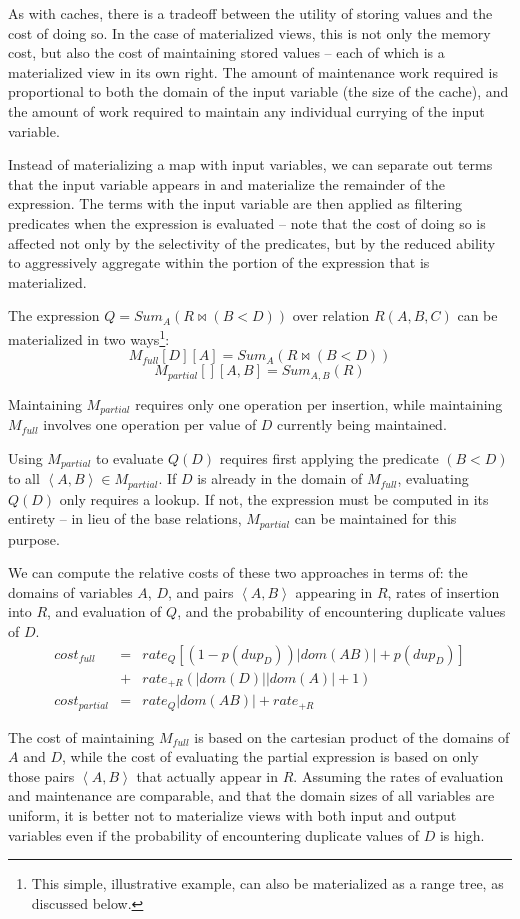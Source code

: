 As with caches, there is a tradeoff between the utility of storing values and the cost of doing so.  In the case of materialized views, this is not only the memory cost, but also the cost of maintaining stored values -- each of which is a materialized view in its own right.  The amount of maintenance work required is proportional to both the domain of the input variable (the size of the cache), and the amount of work required to maintain any individual currying of the input variable.  

Instead of materializing a map with input variables, we can separate out terms that the input variable appears in and materialize the remainder of the expression.  The terms with the input variable are then applied as filtering predicates when the expression is evaluated -- note that the cost of doing so is  affected not only by the selectivity of the predicates, but by the reduced ability to aggressively aggregate within the portion of the expression that is materialized.

\begin{example}
The expression $Q = Sum_A(R \bowtie (B < D))$ over relation $R(A,B,C)$ can be materialized in two ways\footnote{This simple, illustrative example, can also be materialized as a range tree, as discussed below.}:
$$M_{full}[D][A] = Sum_A(R \bowtie (B < D))$$
$$M_{partial}[][A,B] = Sum_{A,B}(R)$$
\end{example}

Maintaining $M_{partial}$ requires only one operation per insertion, while maintaining $M_{full}$ involves one operation per value of $D$ currently being maintained.  

Using $M_{partial}$ to evaluate $Q(D)$ requires first applying the predicate $(B < D)$ to all $\left<A,B\right> \in M_{partial}$.  If $D$ is already in the domain of $M_{full}$, evaluating $Q(D)$ only requires a lookup.  If not, the expression must be computed in its entirety -- in lieu of the base relations, $M_{partial}$ can be maintained for this purpose.

We can compute the relative costs of these two approaches in terms of: the domains of variables $A$, $D$, and pairs $\left<A,B\right>$ appearing in $R$, rates of insertion into $R$, and evaluation of $Q$, and the probability of encountering duplicate values of $D$.
\begin{eqnarray*}
cost_{full} & = & rate_{Q} \left[(1-p(dup_D))|dom(AB)|+p(dup_D)\right] \\
 & + & rate_{+R} (|dom(D)||dom(A)| + 1)\\
cost_{partial} & = & rate_{Q} |dom(AB)| + rate_{+R}
\end{eqnarray*}

The cost of maintaining $M_{full}$ is based on the cartesian product of the domains of $A$ and $D$, while the cost of evaluating the partial expression is based on only those pairs $\left<A,B\right>$ that actually appear in $R$.  Assuming the rates of evaluation and maintenance are comparable, and that the domain sizes of all variables are uniform, it is better not to materialize views with both input and output variables even if the probability of encountering duplicate values of $D$ is high.

